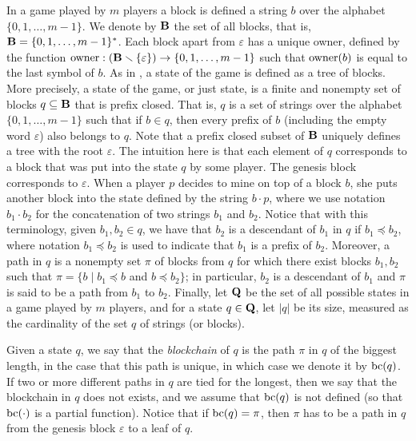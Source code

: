In a game played by $m$ players a block is defined a string $b$ over the alphabet $\{0,1,\ldots, m-1\}$. We denote by $\mathbf{B}$ the set of all blocks, that is, $\mathbf{B} = \{0,1,\ldots , m-1\}^*$. Each block apart from $\varepsilon$ has a unique owner, defined by the function $\text{\rm owner}: (\mathbf{B} \smallsetminus \{\varepsilon\}) \rightarrow \{0,1, \ldots ,m-1\}$ such that $\text{\rm owner}(b)$ is equal to the last symbol of $b$. As in \cite{mininggames:2016}, a state of the game is defined as a tree of blocks. More precisely, a state of the game, or just state,  is a finite and nonempty set of blocks $q \subseteq \mathbf{B}$ that is prefix closed. That is, $q$ is a set of strings over the alphabet $\{0,1,\ldots, m-1\}$ such that if $b\in q$, then every prefix of $b$ (including the empty word $\varepsilon$) also belongs to $q$. Note that a prefix closed subset of $\mathbf{B}$ uniquely defines a tree with the root $\varepsilon$. 
%
The intuition here is that each element of $q$ corresponds to a block that was put into the state $q$ by some player. The genesis block corresponds to $\varepsilon$. When a player $p$ decides to mine on top of a block $b$, she puts another block into the state defined by the string $b\cdot p$, where we use notation $b_1 \cdot b_2$ for the concatenation of two strings $b_1$ and $b_2$.
%
Notice that with this terminology, given $b_1, b_2 \in q$, we have that $b_2$ is a descendant of $b_1$ in $q$ if $b_1 \preceq b_2$, where notation $b_1 \preceq b_2$ is used to indicate that $b_1$ is a prefix of $b_2$. Moreover, a path in $q$ is a nonempty set $\pi$ of blocks from $q$ for which there exist blocks $b_1, b_2$ such that $\pi = \{ b \mid b_1 \preceq b$ and $b \preceq b_2\}$; in particular, $b_2$ is a descendant of $b_1$ and $\pi$ is said to be a path from $b_1$ to $b_2$.
Finally, let $\mathbf{Q}$ be the set of all possible states in a game played by $m$ players, and for a state $q \in \mathbf{Q}$, let $|q|$ be its size, measured as the cardinality of the set $q$ of strings (or blocks). 

Given a state $q$, we say that the {\em blockchain} of $q$ is the path $\pi$ in $q$ of the biggest length, in the case that this path is unique, in which case we denote it by $\text{bc}(q)$. If two or more different paths in $q$ are tied for the longest, then we say that the blockchain in $q$ does not exists, and we assume that $\text{bc}(q)$ is not defined (so that $\text{bc}(\cdot)$ is a partial function).  Notice that if $\text{bc}(q) = \pi$, then $\pi$ has to be a path in $q$ from the genesis block $\varepsilon$ to a leaf of $q$. 

